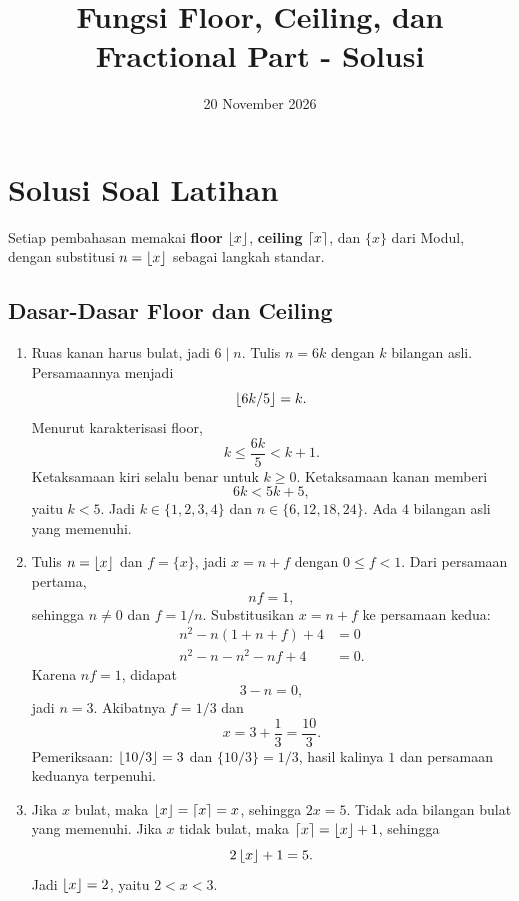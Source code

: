 \documentclass[12pt]{scrartcl}
\title{Fungsi Floor, Ceiling, dan Fractional Part - Solusi}
\date{20 November 2026}
\begin{document}
\maketitle

\renewcommand*\contentsname{Daftar Isi}
\tableofcontents

\newpage

\section{Solusi Soal Latihan}

Setiap pembahasan memakai \textbf{floor} $\left\lfloor x \right\rfloor$,
\textbf{ceiling} $\left\lceil x \right\rceil$, dan
 $\{x\}$ dari Modul,
dengan substitusi $n = \left\lfloor x \right\rfloor$ sebagai langkah standar.

\subsection{Dasar-Dasar Floor dan Ceiling}

\begin{enumerate}
	\item Ruas kanan harus bulat, jadi $6 \mid n$.
	Tulis $n = 6k$ dengan $k$ bilangan asli. Persamaannya menjadi
	\[ \left\lfloor 6k/5 \right\rfloor = k. \]
	Menurut karakterisasi floor,
	\[ k \le \frac{6k}{5} < k + 1. \]
	Ketaksamaan kiri selalu benar untuk $k \ge 0$.
	Ketaksamaan kanan memberi
	\[ 6k < 5k + 5, \]
	yaitu $k < 5$.
	Jadi $k \in \{1, 2, 3, 4\}$ dan $n \in \{6, 12, 18, 24\}$.
	Ada $4$ bilangan asli yang memenuhi.

	\item Tulis $n = \left\lfloor x \right\rfloor$ dan $f = \{x\}$,
	jadi $x = n + f$ dengan $0 \le f < 1$.
	Dari persamaan pertama,
	\[ nf = 1, \]
	sehingga $n \ne 0$ dan $f = 1/n$.
	Substitusikan $x = n + f$ ke persamaan kedua:
	\begin{align*}
	n^2 - n(1 + n + f) + 4 &= 0 \\
	n^2 - n - n^2 - nf + 4 &= 0.
	\end{align*}
	Karena $nf = 1$, didapat
	\[ 3 - n = 0, \]
	jadi $n = 3$. Akibatnya $f = 1/3$ dan
	\[ x = 3 + \frac{1}{3} = \frac{10}{3}. \]
	Pemeriksaan: $\left\lfloor 10/3 \right\rfloor = 3$ dan $\{10/3\} = 1/3$,
	hasil kalinya $1$ dan persamaan keduanya terpenuhi.

	\item Jika $x$ bulat, maka $\left\lfloor x \right\rfloor = \left\lceil x \right\rceil = x$,
	sehingga $2x = 5$. Tidak ada bilangan bulat yang memenuhi.
	Jika $x$ tidak bulat, maka $\left\lceil x \right\rceil = \left\lfloor x \right\rfloor + 1$,
	sehingga
	\[ 2\left\lfloor x \right\rfloor + 1 = 5. \]
	Jadi $\left\lfloor x \right\rfloor = 2$, yaitu $2 < x < 3$.

\end{enumerate}
\end{document}
